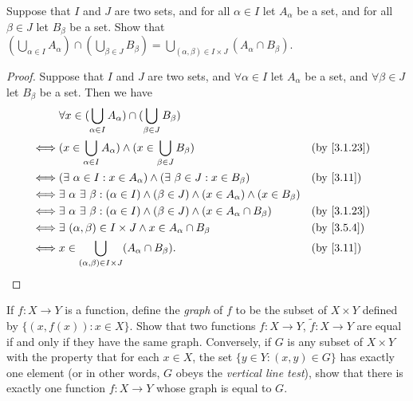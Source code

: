 \begin{ex}\label{ex:3.5.9}
  Suppose that \(I\) and \(J\) are two sets, and for all \(\alpha \in I\) let \(A_{\alpha}\) be a set, and for all \(\beta \in J\) let \(B_{\beta}\) be a set.
  Show that \((\bigcup_{\alpha \in I} A_{\alpha}) \cap (\bigcup_{\beta \in J} B_{\beta}) = \bigcup_{(\alpha, \beta) \in I \times J} (A_{\alpha} \cap B_{\beta})\).
\end{ex}

\begin{proof}
  Suppose that \(I\) and \(J\) are two sets, and \(\forall \alpha \in I\) let \(A_{\alpha}\) be a set, and \(\forall \beta \in J\) let \(B_{\beta}\) be a set.
  Then we have
  \begin{align*}
         & \forall x \in (\bigcup_{\alpha \in I} A_{\alpha}) \cap (\bigcup_{\beta \in J} B_{\beta})                                                              \\
    \iff & (x \in \bigcup_{\alpha \in I} A_{\alpha}) \land (x \in \bigcup_{\beta \in J} B_{\beta})                                &  & \text{(by \cref{3.1.23})} \\
    \iff & (\exists\ \alpha \in I : x \in A_{\alpha}) \land (\exists\ \beta \in J : x \in B_{\beta})                              &  & \text{(by \cref{3.11})}   \\
    \iff & \exists\ \alpha \ \exists\ \beta : (\alpha \in I) \land (\beta \in J) \land (x \in A_{\alpha}) \land (x \in B_{\beta})                                \\
    \iff & \exists\ \alpha \ \exists\ \beta : (\alpha \in I) \land (\beta \in J) \land (x \in A_{\alpha} \cap B_{\beta})          &  & \text{(by \cref{3.1.23})} \\
    \iff & \exists\ (\alpha, \beta) \in I \times J \land x \in A_{\alpha} \cap B_{\beta}                                          &  & \by{3.5.4}                \\
    \iff & x \in \bigcup_{(\alpha, \beta) \in I \times J} (A_{\alpha} \cap B_{\beta}).                                            &  & \text{(by \cref{3.11})}
  \end{align*}
\end{proof}

\begin{ex}\label{ex:3.5.10}
  If \(f : X \to Y\) is a function, define the \emph{graph} of \(f\) to be the subset of \(X \times Y\) defined by \(\{(x, f(x)) : x \in X\}\).
  Show that two functions \(f : X \to Y\), \(\tilde{f} : X \to Y\) are equal if and only if they have the same graph.
  Conversely, if \(G\) is any subset of \(X \times Y\) with the property that for each \(x \in X\), the set \(\{y \in Y : (x, y) \in G\}\) has exactly one element (or in other words, \(G\) obeys the \emph{vertical line test}), show that there is exactly one function \(f : X \to Y\) whose graph is equal to \(G\).
\end{ex}

